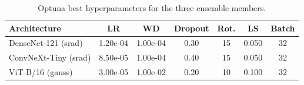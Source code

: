 \begin{table}[htbp]
  \centering
  \small
  \caption{Optuna best hyperparameters for the three ensemble members.}
  \label{tab:hpo-best}
  \begin{tabular}{lcccccc}
    \toprule
    \textbf{Architecture} & \textbf{LR} & \textbf{WD} & \textbf{Dropout} & \textbf{Rot.} & \textbf{LS} & \textbf{Batch} \\
    \midrule
    DenseNet-121 (srad) & 1.20e-04 & 1.00e-04 & 0.30 & 15 & 0.050 & 32 \\
    ConvNeXt-Tiny (srad) & 8.50e-05 & 1.00e-04 & 0.40 & 15 & 0.050 & 32 \\
    ViT-B/16 (gauss) & 3.00e-05 & 1.00e-02 & 0.20 & 10 & 0.100 & 32 \\
    \bottomrule
  \end{tabular}
\end{table}
